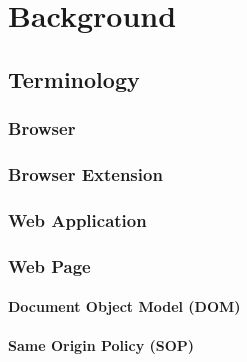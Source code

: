 
\chapter{Background}

\section{Terminology}

\subsection{Browser}

\subsection{Browser Extension}

\subsection{Web Application}

\subsection{Web Page}

\subsubsection{Document Object Model (DOM)}

\subsubsection{Same Origin Policy (SOP)}

